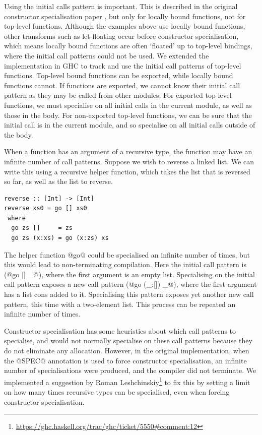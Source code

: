 Using the initial calls pattern is important.
This is described in the original constructor specialisation paper \cite{peyton2007call}, but only for locally bound functions, not for top-level functions.
Although the examples above use locally bound functions, other transforms such as let-floating occur before constructor specialisation, which means locally bound functions are often `floated' up to top-level bindings, where the initial call patterns could not be used.
We extended the implementation in GHC to track and use the initial call patterns of top-level functions.
Top-level bound functions can be exported, while locally bound functions cannot.
If functions are exported, we cannot know their initial call pattern as they may be called from other modules.
For exported top-level functions, we must specialise on all initial calls in the current module, as well as those in the body.
For non-exported top-level functions, we can be sure that the initial call is in the current module, and so specialise on all initial calls outside of the body.


When a function has an argument of a recursive type, the function may have an infinite number of call patterns.
Suppose we wish to reverse a linked list.
We can write this using a recursive helper function, which takes the list that is reversed so far, as well as the list to reverse.

\begin{lstlisting}
reverse :: [Int] -> [Int]
reverse xs0 = go [] xs0
 where
  go zs []     = zs
  go zs (x:xs) = go (x:zs) xs
\end{lstlisting}

The helper function @go@ could be specialised an infinite number of times, but this would lead to non-terminating compilation.
Here the initial call pattern is (@go [] _@), where the first argument is an empty list.
Specialising on the initial call pattern exposes a new call pattern (@go (_:[]) _@), where the first argument has a list cons added to it.
Specialising this pattern exposes yet another new call pattern, this time with a two-element list.
This process can be repeated an infinite number of times.

Constructor specialisation has some heuristics about which call patterns to specialise, and would not normally specialise on these call patterns because they do not eliminate any allocation.
However, in the original implementation, when the @SPEC@ annotation is used to force constructor specialisation, an infinite number of specialisations were produced, and the compiler did not terminate.
We implemented a suggestion by Roman Leshchinskiy\footnote{\url{https://ghc.haskell.org/trac/ghc/ticket/5550\#comment:12}} to fix this by setting a limit on how many times recursive types can be specialised, even when forcing constructor specialisation.

